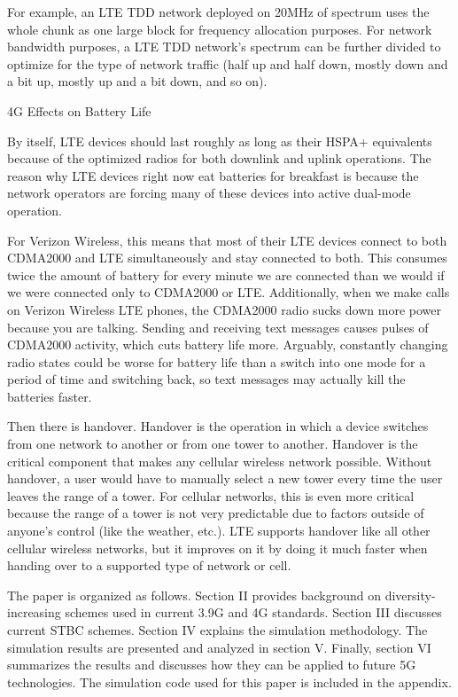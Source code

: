 \documentclass[12pt,onecolumn]{IEEEtran}
\begin{document}
For example, an LTE TDD network deployed on 20MHz of spectrum uses the whole chunk as one large block for frequency allocation purposes. For network bandwidth purposes, a LTE TDD network’s spectrum can be further divided to optimize for the type of network traffic (half up and half down, mostly down and a bit up, mostly up and a bit down, and so on).


4G Effects on Battery Life

By itself, LTE devices should last roughly as long as their HSPA+ equivalents because of the optimized radios for both downlink and uplink operations. The reason why LTE devices right now eat batteries for breakfast is because the network operators are forcing many of these devices into active dual-mode operation.

For Verizon Wireless, this means that most of their LTE devices connect to both CDMA2000 and LTE simultaneously and stay connected to both. This consumes twice the amount of battery for every minute we are connected than we would if we were connected only to CDMA2000 or LTE. Additionally, when we make calls on Verizon Wireless LTE phones, the CDMA2000 radio sucks down more power because you are talking. Sending and receiving text messages causes pulses of CDMA2000 activity, which cuts battery life more. Arguably, constantly changing radio states could be worse for battery life than a switch into one mode for a period of time and switching back, so text messages may actually kill the batteries faster.

Then there is handover. Handover is the operation in which a device switches from one network to another or from one tower to another. Handover is the critical component that makes any cellular wireless network possible. Without handover, a user would have to manually select a new tower every time the user leaves the range of a tower. For cellular networks, this is even more critical because the range of a tower is not very predictable due to factors outside of anyone’s control (like the weather, etc.). LTE supports handover like all other cellular wireless networks, but it improves on it by doing it much faster when handing over to a supported type of network or cell.

The paper is organized as follows. Section II provides background on diversity-increasing schemes used in current 3.9G and 4G standards. Section III discusses current STBC schemes. Section IV explains the simulation methodology. The simulation results are presented and analyzed in section V. Finally, section VI summarizes the results and discusses how they can be applied to future 5G technologies. The simulation code used for this paper is included in the appendix.
\end{document}
